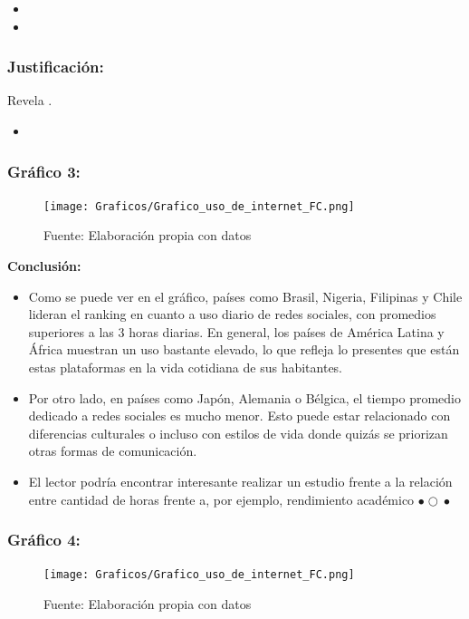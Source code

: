 \documentclass[12pt, a4paper]{article}
\begin{document}
\begin{itemize}
    \item 
    \item 
\end{itemize}

\subsubsection*{Justificación: }
Revela .
\begin{itemize}
    \item 
\end{itemize}

\subsubsection*{Gráfico 3: }
\begin{figure}[H]
    \centering
    \texttt{[image: Graficos/Grafico\_uso\_de\_internet\_FC.png]}
    \caption[3]{Fuente: Elaboración propia con datos}
\end{figure}

\newpage
\textbf{Conclusión:}  
\begin{itemize}
    \item Como se puede ver en el gráfico, países como Brasil, Nigeria, Filipinas y Chile lideran el ranking en cuanto a uso diario de redes sociales, con promedios superiores a las 3 horas diarias. En general, los países de América Latina y África muestran un uso bastante elevado, lo que refleja lo presentes que están estas plataformas en la vida cotidiana de sus habitantes.
    \item Por otro lado, en países como Japón, Alemania o Bélgica, el tiempo promedio dedicado a redes sociales es mucho menor. Esto puede estar relacionado con diferencias culturales o incluso con estilos de vida donde quizás se priorizan otras formas de comunicación.
    \item El lector podría encontrar interesante realizar un estudio frente a la relación entre cantidad de horas frente a, por ejemplo, rendimiento académico $\bullet{}\bigcirc{}\bullet{}$
\end{itemize}

\subsubsection*{Gráfico 4: }
\begin{figure}[H]
    \centering
    \texttt{[image: Graficos/Grafico\_uso\_de\_internet\_FC.png]}
    \caption[4]{Fuente: Elaboración propia con datos}

\end{figure}
\end{document}
